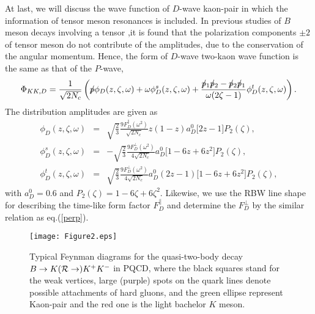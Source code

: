 \documentclass[11pt]{article}
\begin{document}
At last, we will discuss the wave function of $D$-wave kaon-pair in which the information of tensor meson resonances is included. In previous studies of $B$ meson decays involving a tensor \cite{Zou:2012td,Cheng:2010yd},it is found that the polarization components $\pm2$ of tensor meson do not contribute of the amplitudes, due to the conservation of the angular momentum. Hence, the form of $D$-wave two-kaon wave function is the same as that of the $P$-wave,
 \begin{eqnarray}
 \Phi_{KK,D}=\frac{1}{\sqrt{2N_c}}\left(p\mkern-8.5mu/\phi_D(z,\zeta,\omega)+\omega\phi_D^s(z,\zeta,\omega)
+\frac{p\mkern-8.5mu/_1p\mkern-8.5mu/_2-p\mkern-8.5mu/_2p\mkern-8.5mu/_1}{\omega(2\zeta-1)}\phi_D^t(z,\zeta,\omega)\right).
\end{eqnarray}
The distribution amplitudes are given as
\begin{eqnarray}
\phi_D(z,\zeta,\omega)
&=&\sqrt{\frac{2}{3}}\frac{9F_D^{\parallel}(\omega^2)}{\sqrt{2N_c}}z(1-z)a_D^0\Big[2z-1\Big]P_2(\zeta),\\
\phi_D^s(z,\zeta,\omega)
&=&-\sqrt{\frac{2}{3}}\frac{9F_D^{\perp}(\omega^2)}{4\sqrt{2N_c}}a_D^0\Big[1-6z+6z^2\Big]P_2(\zeta),\\
\phi_D^t(z,\zeta,\omega)
&=&\sqrt{\frac{2}{3}}\frac{9F_D^{\perp}(\omega^2)}{4\sqrt{2N_c}}a_D^0(2z-1)\Big[1-6z+6z^2\Big]P_2(\zeta),
\end{eqnarray}
with $a_D^0=0.6$ and $P_2(\zeta)=1-6\zeta+6\zeta^2$. Likewise, we use the RBW line shape for describing the time-like form factor $F_D^{\parallel}$ and determine the $F_D^{\perp}$ by the similar relation as eq.(\ref{perp}).

\begin{figure}[!htb]
\begin{center}
\texttt{[image: Figure2.eps]}
\caption{Typical Feynman diagrams for the quasi-two-body decay $B \to K ({\cal R}\to) K^+ K^-$ in PQCD, where the black squares stand for the weak vertices, large (purple) spots on the quark lines denote possible attachments of hard gluons, and the green ellipse represent Kaon-pair and the red one is the light bachelor $K$ meson\cite{Zou:2020atb}.}\label{feynman}
\end{center}
\end{figure}
\end{document}
